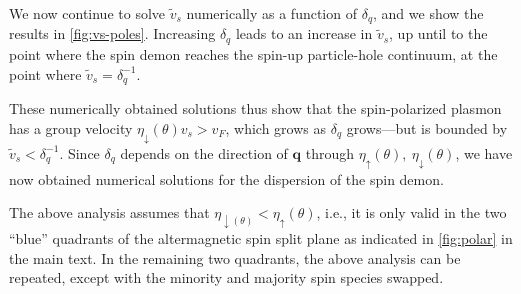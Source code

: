 \documentclass[aps,prb,reprint,twocolumns,superscriptaddress,nofootinbib]{revtex4-2}
\newcommand{\pg}[1]{\textcolor{red}{PG: #1}}
\begin{document}
	
	
	
	
	We now continue to solve  $\tilde v_s$ numerically as a function of $\delta_q$, and we show the results in \cref{fig:vs-poles}.  Increasing $\delta_q$ leads to an increase in $\tilde v_s$, up until to the point where the spin demon reaches the spin-up particle-hole continuum, at the point where  $\tilde v_s=\delta_q^{-1}$.

	These numerically obtained solutions thus show that the spin-polarized plasmon has a group velocity $\eta_{\downarrow}(\theta)v_s>v_F$, which grows as $\delta_q$ grows---but is bounded by $\tilde v_s < \delta_q^{-1}$. 
	Since $\delta_q$ depends on the direction of $\bm q$ through $\eta_\uparrow(\theta),\ \eta_\downarrow(\theta)$, we have now obtained numerical solutions for the dispersion of the spin demon. 

	The above analysis assumes that $\eta_{\downarrow(\theta)}<\eta_{\uparrow}(\theta)$, i.e., it is only valid in the two ``blue'' quadrants of the altermagnetic spin split plane as indicated in \cref{fig:polar} in the main text. In the remaining two quadrants, the above analysis can be repeated, except with the minority and majority spin species swapped. 
	
\end{document}
